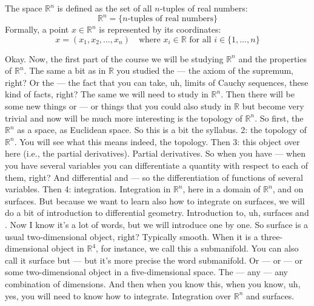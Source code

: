 \begin{math-stroke}
\begin{definition}
The space $\mathbb{R}^n$ is defined as the set of all $n$-tuples of real numbers:
\[ \mathbb{R}^n = \{ n\text{-tuples of real numbers} \} \]
Formally, a point $x \in \mathbb{R}^n$ is represented by its coordinates:
\[ x = (x_1, x_2, \dots, x_n) \quad \text{where } x_i \in \mathbb{R} \text{ for all } i \in \{1, \dots, n\} \]
\end{definition}
\end{math-stroke}

\begin{spoken-clean}[00:17:38 - 00:21:13]
Okay. Now, the first part of the course we will be studying $\mathbb{R}^n$ and the properties of $\mathbb{R}^n$. The same a bit as in $\mathbb{R}$ you studied the — the axiom of the supremum, right? Or the — the fact that you can take, uh, limits of Cauchy sequences, these kind of facts, right? The same we will need to study in $\mathbb{R}^n$. Then there will be some new things or — or things that you could also study in $\mathbb{R}$ but become very trivial and now will be much more interesting is the topology of $\mathbb{R}^n$. So first, the $\mathbb{R}^n$ as a space, as Euclidean space. So this is a bit the syllabus. 2: the topology of $\mathbb{R}^n$. You will see what this means indeed, the topology. Then 3: this object over here  (i.e., the partial derivatives). Partial derivatives. So when you have — when you have several variables you can differentiate a quantity with respect to each of them, right? And differential and — so the differentiation of functions of several variables. Then 4: integration. Integration in $\mathbb{R}^n$, here in a domain of $\mathbb{R}^n$, and on surfaces. But because we want to learn also how to integrate on surfaces, we will do a bit of introduction to differential geometry. Introduction to, uh, surfaces and . Now I know it's a lot of words, but we will introduce one by one. So surface is a usual two-dimensional object, right? Typically smooth. When it is a three-dimensional object in $\mathbb{R}^4$, for instance, we call this a submanifold. You can also call it surface but — but it's more precise the word submanifold. Or — or — or some two-dimensional object in a five-dimensional space. The — any — any combination of dimensions. And then when you know this, when you know, uh, yes, you will need to know how to integrate. Integration over $\mathbb{R}^n$ and surfaces.
\end{spoken-clean}

